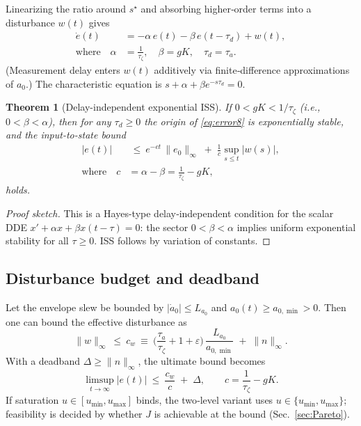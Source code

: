 \documentclass[aps,pre,twocolumn,showpacs,superscriptaddress]{revtex4-2}
\newtheorem{theorem}{Theorem}
\theoremstyle{definition}
\newcommand{\tauz}{\tau_\zeta}
\begin{document}
Linearizing the ratio around $s^\star$ and absorbing higher‑order terms into a disturbance $w(t)$ gives
\begin{align}\label{eq:error8}
\dot e(t)&= -\alpha\,e(t) - \beta\,e(t-\tau_d) + w(t),\\
\text{where}\quad\alpha&=\frac{1}{\tauz},\quad \beta=gK,\quad \tau_d=\tau_a.\nonumber
\end{align}
(Measurement delay enters $w(t)$ additively via finite‑difference approximations of $a_0$.) The characteristic equation is $s+\alpha+\beta e^{-s\tau_d}=0$.

\begin{theorem}[Delay-independent exponential ISS]\label{thm:ISS8}
If $0<gK<1/\tauz$ (i.e., $0<\beta<\alpha$), then for any $\tau_d\ge 0$ the origin of \eqref{eq:error8} is exponentially stable, and the input-to-state bound
\begin{align}\label{eq:ISSbound8}
|e(t)|&\ \le\ e^{-c t}\,\|e_0\|_\infty\;+\;\frac{1}{c}\sup_{s\le t}|w(s)|,\\
\text{where}\quad c&=\alpha-\beta=\frac{1}{\tauz}-gK,\nonumber
\end{align}
holds. 
\end{theorem}

\begin{proof}[Proof sketch]
This is a Hayes-type delay‑independent condition for the scalar DDE $x'+\alpha x+\beta x(t-\tau)=0$: the sector $0<\beta<\alpha$ implies uniform exponential stability for all $\tau\ge 0$. ISS follows by variation of constants.
\end{proof}

\subsection{Disturbance budget and deadband}\label{subsec:deadband8}

Let the envelope slew be bounded by $|\dot a_0|\le L_{a_0}$ and $a_0(t)\ge a_{0,\min}>0$. Then one can bound the effective disturbance as
\begin{equation}\label{eq:dist8}
\|w\|_\infty \ \le\ c_w \ \equiv\ \Big(\frac{\tau_a}{\tauz}+1+\varepsilon\Big)\,\frac{L_{a_0}}{a_{0,\min}} \;+\; \|n\|_\infty.
\end{equation}
With a deadband $\Delta\ge \|n\|_\infty$, the ultimate bound becomes
\begin{equation}\label{eq:ultimate8}
\limsup_{t\to\infty}|e(t)| \ \le\ \frac{c_w}{c}\;+\;\Delta,\qquad c=\frac{1}{\tauz}-gK.
\end{equation}
If saturation $u\in[u_{\min},u_{\max}]$ binds, the two‑level variant uses $u\in\{u_{\min},u_{\max}\}$; feasibility is decided by whether $J$ is achievable at the bound (Sec.~\ref{sec:Pareto}).
\end{document}
